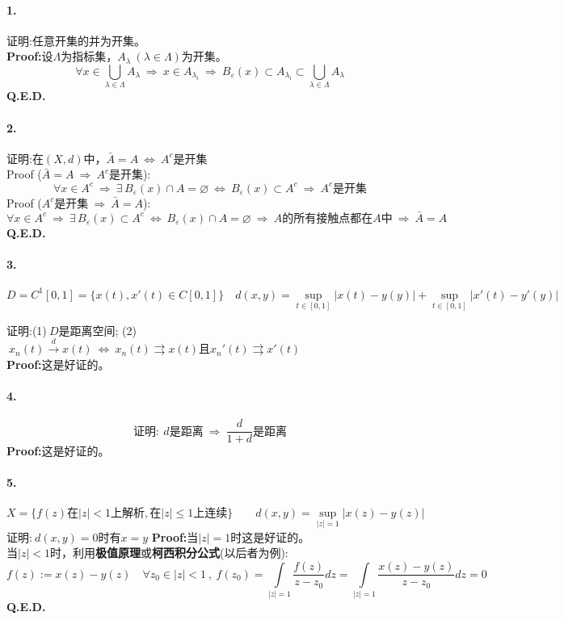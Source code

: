 \paragraph*{1.}证明:任意开集的并为开集。\\
\textbf{Proof:}设$\Lambda$为指标集，$A_{\lambda} \ (\lambda \in \Lambda)$为开集。
\[\forall x \in \bigcup_{\lambda \in \Lambda}A_{\lambda} \ \Rightarrow \ x \in A_{\lambda_i} \ \Rightarrow \ B_{\varepsilon}(x) \subset A_{\lambda_i} \subset \bigcup_{\lambda \in \Lambda}A_{\lambda}\]
\textbf{Q.E.D.}

\paragraph*{2.}证明:在$(X,d)$中，$\bar{A}=A \ \Leftrightarrow \ A^c$是开集\\
Proof ($\bar{A}=A \ \Rightarrow \ A^c$是开集):
\[\forall x \in A^c \ \Rightarrow \ \exists \, B_{\varepsilon}(x) \cap A=\varnothing \ \Leftrightarrow \ B_{\varepsilon}(x) \subset A^c \ \Rightarrow \ A^c\text{是开集}\]
Proof ($A^c$是开集$ \ \Rightarrow \ \bar{A}=A$):
\[\forall x \in A^c \ \Rightarrow \ \exists \, B_{\varepsilon}(x) \subset A^c \ \Leftrightarrow \ B_{\varepsilon}(x) \cap A=\varnothing \ \Rightarrow \ A\text{的所有接触点都在$A$中} \ \Rightarrow \ \bar{A}=A\]
\textbf{Q.E.D.}

\paragraph*{3.}
\[D=C^1[0,1]=\{x(t),x'(t) \in C[0,1]\} \quad d(x,y)=\mathop \text{sup}\limits_{t \in [0,1]}|x(t)-y(y)|+\mathop \text{sup}\limits_{t \in [0,1]}|x'(t)-y'(y)|\]

证明:(1)$\ D$是距离空间; \quad (2)$\ x_n(t) \xrightarrow{d} x(t) \ \Leftrightarrow \ x_n(t) \rightrightarrows x(t)\text{且}x_n'(t) \rightrightarrows x'(t)$\\
\textbf{Proof:}这是好证的。

\paragraph*{4.}
\[\text{证明}: \ d\text{是距离} \ \Rightarrow \ \frac{d}{1+d}\text{是距离}\]
\textbf{Proof:}这是好证的。

\paragraph*{5.}
\[X=\{f(z)\text{在}|z|<1\text{上解析},\text{在}|z| \leq 1\text{上连续}\} \qquad d(x,y)=\mathop \text{sup}\limits_{|z|=1}|x(z)-y(z)|\]
证明:$\ d(x,y)=0$时有$x=y$
\textbf{Proof:}当$|z|=1$时这是好证的。\\
当$|z|<1$时，利用\textbf{极值原理}或\textbf{柯西积分公式}(以后者为例):
\[f(z):=x(z)-y(z) \quad \forall z_0 \in |z|<1 \ , \ f(z_0)=\int\limits_{|z|=1}\frac{f(z)}{z-z_0}dz=\int\limits_{|z|=1}\frac{x(z)-y(z)}{z-z_0}dz=0\]
\textbf{Q.E.D.}

